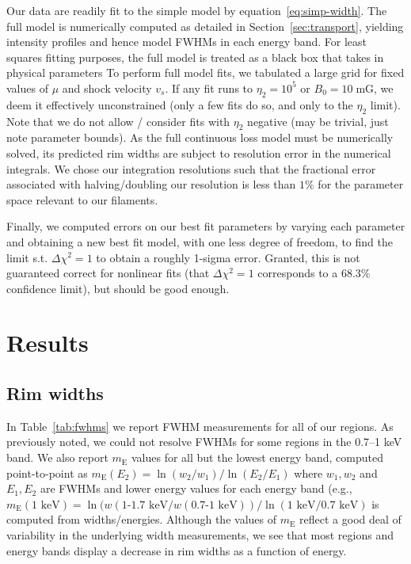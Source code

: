 \documentclass[iop, apj, numberedappendix, twocolappendix]{emulateapj}
\newcommand*{\mt}{\mathrm}
\newcommand*{\unit}[1]{\;\mt{#1}}  %
\newcommand*{\mE}{m_\mathrm{E}}
\begin{document}
Our data are readily fit to the simple model by equation~\eqref{eq:simp-width}.
The full model is numerically computed as detailed in
Section~\ref{sec:transport}, yielding intensity profiles and hence model FWHMs
in each energy band.
For least squares fitting purposes, the full model is treated as a black box
that takes in physical parameters
To perform full model fits, we tabulated a large grid for fixed values of $\mu$
and shock velocity $v_s$.  If any fit runs to $\eta_2 = 10^5$ or $B_0 = 10
\unit{mG}$, we deem it effectively unconstrained (only a few fits do so, and
only to the $\eta_2$ limit).  Note that we do not allow / consider fits with
$\eta_2$ negative (may be trivial, just note parameter bounds).  As the full
continuous loss model must be numerically solved, its predicted rim widths are
subject to resolution error in the numerical integrals.  We chose our
integration resolutions such that the fractional error associated with
halving/doubling our resolution is less than $1\%$ for the parameter space
relevant to our filaments.

Finally, we computed errors on our best fit parameters by varying each
parameter and obtaining a new best fit model, with one less degree of freedom,
to find the limit s.t. $\Delta \chi^2 = 1$ to obtain a roughly 1-sigma error.
Granted, this is not guaranteed correct for nonlinear fits (that $\Delta \chi^2
= 1$ corresponds to a $68.3$\% confidence limit), but should be good enough.

\section{Results}

\subsection{Rim widths}
\label{sec:fwhm-results}

In Table~\ref{tab:fwhms} we report FWHM measurements for all of our regions.
As previously noted, we could not resolve FWHMs for some regions in the
0.7--1 keV band.  We also report $\mE$ values for all but the lowest energy
band, computed point-to-point as $\mE(E_2) = \ln(w_2/w_1) / \ln(E_2/E_1)$ where
$w_1, w_2$ and $E_1, E_2$ are FWHMs and lower energy values for each energy
band (e.g., $\mE(\text{1 keV}) = \ln(w(\text{1-1.7 keV}/w(\text{0.7-1 keV})) /
\ln(\text{1 keV}/\text{0.7 keV})$ is computed from widths/energies.  Although
the values of $\mE$ reflect a good deal of variability in the underlying width
measurements, we see that most regions and energy bands display a decrease in
rim widths as a function of energy.
\end{document}
